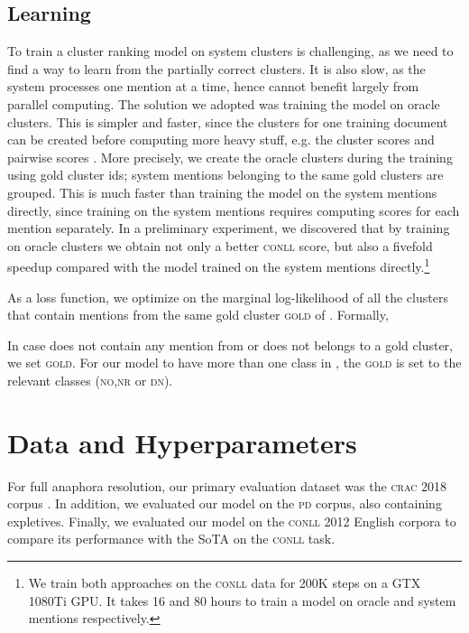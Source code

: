 \documentclass[10pt, a4paper]{article}
\newcommand{\ACRO}[1]{\textsc{#1}}
\newcommand{\CONLL}{\ACRO{conll}}
\newcommand{\CRAC}{\ACRO{crac}}
\newcommand{\PD}{\ACRO{pd}}
\newcommand{\DN}{\ACRO{dn}}
\newcommand{\NO}{\ACRO{no}}
\newcommand{\NR}{\ACRO{nr}}
\begin{document}
\subsection{Learning}
To train a cluster ranking model on system clusters is challenging, as we need to find a way to learn from the partially correct clusters. It is also slow, as the system processes one mention at a time, hence cannot benefit largely from parallel computing.
The solution we adopted was training the model on oracle clusters.
This 
is simpler and faster, since the clusters for one training document can be created before computing more heavy stuff, e.g. the cluster scores  and pairwise scores . 
More precisely, we create the oracle clusters during the training using gold cluster ids; system mentions belonging to the same gold clusters are grouped.  
This is much faster 
than training the model
on the system mentions directly, since training on the system mentions requires
computing scores for each mention separately. 
In a preliminary experiment, we discovered that by training on 
oracle clusters 
we obtain not only a better {\CONLL} score, but also a 
fivefold speedup
compared with the model trained on the system mentions directly.\footnote{We train both approaches on the {\CONLL} data for 200K steps on a GTX 1080Ti GPU. It takes 16 and 80 hours to train a model on oracle and system mentions respectively.} 


As a 
loss function, we 
optimize on the marginal log-likelihood of all the clusters that contain mentions from the same gold cluster \textsc{gold} of .
Formally,

\small

\normalsize


In case  does not contain any mention from  or  does not belongs to a gold cluster, we set \textsc{gold}. For our model to have more than one class in , the \textsc{gold} is set to the relevant classes ({\NO},{\NR} or {\DN}). 



\section{Data and Hyperparameters}

For full anaphora resolution, our 
primary evaluation dataset was 
the {\CRAC} 2018 corpus \cite{poesio2018crac}. 
In addition, we evaluated our model on the {\PD} corpus, also containing expletives.
Finally, we  evaluated our model on the {\CONLL} 2012 English corpora \cite{pradhan2012conllst} to compare its performance with the SoTA on the {\CONLL} task. 
\end{document}
